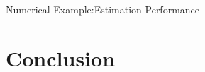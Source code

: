 \documentclass[10pt]{beamer}
\newlength\figureheight
\newlength\figurewidth
\newcommand{\tikzdir}[1]{#1.tikz}
\newcommand{\inputtikz}[1]{}}
\begin{document}
\begin{frame}{Numerical Example:Estimation Performance}
  \begin{figure}[ht]
    \begin{center}
      \setlength{\figureheight}{5cm}
      \setlength{\figurewidth}{6cm}
      \inputtikz{variance}
    \end{center}
    \label{fig:variance}
  \end{figure}
\end{frame}

%

\section{Conclusion}
\end{document}
